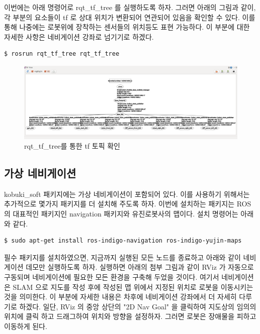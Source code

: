 이번에는 아래 명령어로 rqt\_tf\_tree 를 실행하도록 하자. 그러면 아래의 그림과 같이, 각 부분의 요소들이 tf 로 상대 위치가 변환되어 연관되어 있음을 확인할 수 있다. 이를 통해 나중에는 로봇위에 장착하는 센서들의 위치등도 표현 가능하다. 이 부분에 대한 자세한 사항은 네비게이션 강좌로 넘기기로 하겠다.

\vspace{\baselineskip}
\begin{lstlisting}[language=ROS]
$ rosrun rqt_tf_tree rqt_tf_tree 
\end{lstlisting}

\begin{figure}[h]
\centering\includegraphics[width=0.9\columnwidth]{pictures/chapter10/rqt_tf_tree_kobuki_tf.png}
\caption{rqt\_tf\_tree를 통한 tf 토픽 확인}
\end{figure}

\subsection{가상 네비게이션}

kobuki\_soft 패키지에는 가상 네비게이션이 포함되어 있다. 이를 사용하기 위해서는 추가적으로 몇가지 패키지를 더 설치해 주도록 하자. 이번에 설치하는 패키지는 ROS 의 대표적인 패키지인 navigation 패키지와 유진로봇사의 맵이다. 설치 명령어는 아래와 같다.

\vspace{\baselineskip}
\begin{lstlisting}[language=ROS]
$ sudo apt-get install ros-indigo-navigation ros-indigo-yujin-maps
\end{lstlisting}

필수 패키지를 설치하였으면, 지금까지 실행된 모든 노드를 종료하고 아래와 같이 네비게이션 데모만 실행하도록 하자. 실행하면 아래의 첨부 그림과 같이 RViz 가 자동으로 구동되며 네비게이션에 필요한 모든 환경을 구축해 두었을 것이다. 여기서 네비게이션은 SLAM 으로 지도를 작성 후에  작성된 맵 위에서 지정된 위치로 로봇을 이동시키는 것을 의미한다. 이 부분에 자세한 내용은 차후에 네비게이션 강좌에서 더 자세히 다루기로 하겠다. 일단, RViz 의 중앙 상단의 "2D Nav Goal" 을 클릭하여 지도상의 임의의 위치에 클릭 하고 드래그하여 위치와 방향을 설정하자. 그러면 로봇은 장애물을 피하고 이동하게 된다. 

